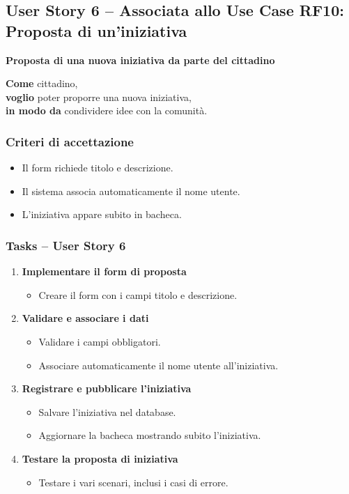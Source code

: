 \documentclass{article}
\begin{document}

\subsection{User Story 6 -- Associata allo Use Case RF10: Proposta di un'iniziativa}

\textbf{Proposta di una nuova iniziativa da parte del cittadino}

\textbf{Come} cittadino,\\
\textbf{voglio} poter proporre una nuova iniziativa,\\
\textbf{in modo da} condividere idee con la comunità.

\subsubsection{Criteri di accettazione}
\begin{itemize}
    \item Il form richiede titolo e descrizione.
    \item Il sistema associa automaticamente il nome utente.
    \item L’iniziativa appare subito in bacheca.
\end{itemize}

\subsubsection{Tasks -- User Story 6}
\begin{enumerate}
    \item \textbf{Implementare il form di proposta}
    \begin{itemize}
        \item Creare il form con i campi titolo e descrizione.
    \end{itemize}

    \item \textbf{Validare e associare i dati}
    \begin{itemize}
        \item Validare i campi obbligatori.
        \item Associare automaticamente il nome utente all'iniziativa.
    \end{itemize}

    \item \textbf{Registrare e pubblicare l'iniziativa}
    \begin{itemize}
        \item Salvare l'iniziativa nel database.
        \item Aggiornare la bacheca mostrando subito l'iniziativa.
    \end{itemize}

    \item \textbf{Testare la proposta di iniziativa}
    \begin{itemize}
        \item Testare i vari scenari, inclusi i casi di errore.
    \end{itemize}
\end{enumerate}
\end{document}
